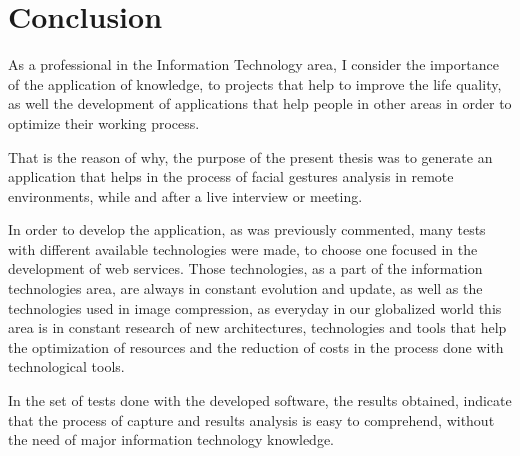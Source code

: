\documentclass[12pt,letterpaper,titlepage]{book}
\begin{document}
\chapter{Conclusion}\label{conclusiones}
As a professional in the Information Technology area, I consider the importance of the application of knowledge, to projects that help to improve the life quality, as well the development of applications that help people in other areas in order to optimize their working process.

That is the reason of why, the purpose of the present thesis was to generate an application that helps in the process of facial gestures analysis in remote environments, while and after a live interview or meeting.

In order to develop the application, as was previously commented, many tests with different available technologies were made, to choose one focused in the development of web services. Those technologies, as a part of the information technologies area, are always in constant evolution and update, as well as the technologies used in image compression, as everyday in our globalized world this area is in constant research of new architectures, technologies and tools that help the optimization of resources and the reduction of costs in the process done with technological tools.

In the set of tests done with the developed software, the results obtained, indicate that the process of capture and results analysis is easy to comprehend, without the need of major information technology knowledge.




\newpage


\end{document}
